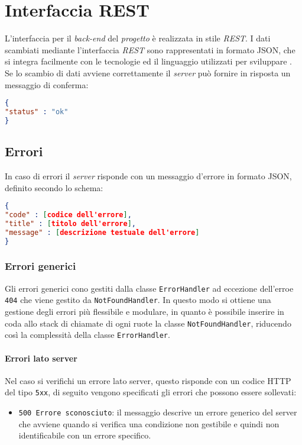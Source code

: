 \newpage
\section{Interfaccia REST}
L'interfaccia per il \textit{back-end} del \textit{progetto} \textit{\progetto} è realizzata in stile \textit{REST}.
I dati scambiati mediante l'interfaccia \textit{REST} sono rappresentati in formato JSON, che si integra facilmente con le tecnologie ed il linguaggio utilizzati per sviluppare \progetto. \\
Se lo scambio di dati avviene correttamente il \textit{server} può fornire in risposta un messaggio di conferma:
\begin{lstlisting}[language=json,firstnumber=1]
{
"status" : "ok"
}
\end{lstlisting}
\subsection{Errori}
In caso di errori il \textit{server} risponde con un messaggio d'errore in formato JSON, definito secondo lo schema:
\begin{lstlisting}[language=json,firstnumber=1]
{
"code" : [codice dell'errore],
"title" : [titolo dell'errore],
"message" : [descrizione testuale dell'errore]
}
\end{lstlisting}
\subsubsection{Errori generici}
Gli errori generici cono gestiti dalla classe \texttt{ErrorHandler} ad eccezione dell'erroe \texttt{404} che viene gestito da \texttt{NotFoundHandler}. In questo modo si ottiene una gestione degli errori più flessibile e modulare, in quanto è possibile inserire in coda allo stack di chiamate di ogni ruote la classe \texttt{NotFoundHandler}, riducendo così la complessità della classe \texttt{ErrorHandler}.

\paragraph{Errori lato server}
Nel caso si verifichi un errore lato server, questo risponde con un codice HTTP del tipo \texttt{5xx}, di seguito vengono specificati gli errori che possono essere sollevati:
	\begin{itemize}
		\item \texttt{500 Errore sconosciuto}: il messaggio descrive un errore generico del server che avviene quando si verifica una condizione non gestibile e quindi non identificabile con un errore specifico.
	\end{itemize}
